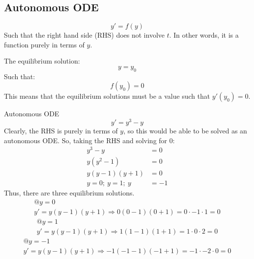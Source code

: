 \documentclass[12pt]{article}
\begin{document}
\subsection{Autonomous ODE}
\label{ssec:autonomousODE}

\begin{equation*}
  y' = f(y)
\end{equation*}
Such that the right hand side (RHS) does not involve $t$. In other words, it is a function purely in terms of $y$.

The equilibrium solution:
\begin{equation*}
  y = y_0
\end{equation*}
Such that:
\begin{equation*}
  f(y_0) = 0
\end{equation*}
This means that the equilibrium solutions must be a value such that $y'(y_0)=0$.
\begin{example}{Autonomous ODE}
  \begin{equation*}
    y' = y^3 - y
  \end{equation*}
  Clearly, the RHS is purely in terms of $y$, so this would be able to be solved as an autonomous ODE. So, taking the RHS and solving for $0$:
  \begin{align*}
    y^3 - y &= 0 \\
    y\left(y^2 - 1\right) &= 0 \\
    y\left(y - 1\right)\left(y + 1\right) &= 0 \\
    y = 0;\ y = 1;\ y &= -1
  \end{align*}
  Thus, there are three equilibrium solutions.
  \begin{gather*}
    @y=0\\
    y' = y\left(y - 1\right)\left(y + 1\right) \Rightarrow 0\left(0 - 1\right)\left(0 + 1\right) = 0 \cdot -1 \cdot 1 = 0
  \end{gather*}
  \begin{gather*}
    @y=1\\
    y' = y\left(y - 1\right)\left(y + 1\right) \Rightarrow 1\left(1 - 1\right)\left(1 + 1\right) = 1 \cdot 0 \cdot 2 = 0
  \end{gather*}
  \begin{gather*}
    @y=-1\\
    y' = y\left(y - 1\right)\left(y + 1\right) \Rightarrow -1\left(-1 - 1\right)\left(-1 + 1\right) = -1 \cdot -2 \cdot 0 = 0
  \end{gather*}
\end{example}
\end{document}
